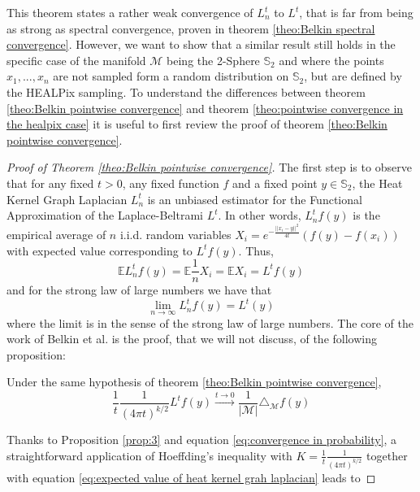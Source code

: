 This theorem states a rather weak convergence of $L_n^t$ to $L^t$, that is far from being as strong as spectral convergence, proven in theorem \ref{theo:Belkin spectral convergence}. However, we want to show that a similar result still holds in the specific case of the manifold $\mathcal M$ being the 2-Sphere $\mathbb S_2$ and where the points $x_1, ..., x_n$ are not sampled form a random distribution on $\mathbb S_2$, but are defined by the HEALPix sampling. To understand the differences between theorem \ref{theo:Belkin pointwise convergence} and theorem \ref{theo:pointwise convergence in the healpix case} it is useful to first review the proof of theorem \ref{theo:Belkin pointwise convergence}.
\begin{proof}[Proof of Theorem \ref{theo:Belkin pointwise convergence}]
The first step is to observe that for any fixed $t>0$, any fixed function $f$ and a fixed point $y\in\mathbb S_2$,  the Heat Kernel Graph Laplacian $L_n^t$ is an unbiased estimator for the Functional Approximation of the Laplace-Beltrami $L^t$. In other words, $L_n^tf(y)$ is the empirical average of $n$ i.i.d. random variables $X_i= e^{-\frac{||x_i-y||^2}{4t}}\left(f(y)-f(x_i)\right)$ with expected value corresponding to $L^tf(y)$. Thus,
\begin{equation}
\label{eq:expected value of heat kernel grah laplacian}
	\mathbb E L_n^tf(y) = 	\mathbb E \frac{1}{n}X_i = \mathbb E X_i = L^tf(y)
\end{equation}
and for the strong law of large numbers we have that
\begin{equation}
\label{eq:convergence in probability}
\lim_{n\to\infty}L_n^tf(y) = L^t(y)
\end{equation}
where the limit is in the sense of the strong law of large numbers.
The core of the work of Belkin et al. is the proof, that we will not discuss, of the following proposition:

\begin{prop} Under the same hypothesis of theorem \ref{theo:Belkin pointwise convergence},
	$$\frac{1}{t}\frac{1}{(4\pi t)^{k/2}} L^tf(y) \xrightarrow{t\to 0 } \frac{1}{|\mathcal M|}\triangle_{\mathcal M}f(y)$$
	\label{prop:3}
\end{prop}

Thanks to Proposition \ref{prop:3} and equation \ref{eq:convergence in probability}, a straightforward application of Hoeffding's inequality with $K=\frac{1}{t}\frac{1}{(4\pi t)^{k/2}}$ together with equation  \ref{eq:expected value of heat kernel grah laplacian} leads to


\end{proof}
